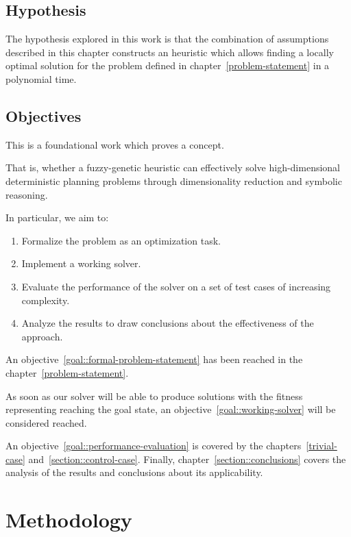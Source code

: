 \documentclass[12pt, a4paper]{report}
\begin{document}
	\section{Hypothesis}
	The hypothesis explored in this work is that the combination of assumptions described in this chapter constructs an heuristic which allows finding a locally optimal solution for the problem defined in chapter~\ref{problem-statement} in a polynomial time.
	
	\section{Objectives}\label{section::objectives}
	
	This is a foundational work which proves a concept.
	
	That is, whether a fuzzy-genetic heuristic can effectively solve high-dimensional deterministic planning problems through dimensionality reduction and symbolic reasoning.
	
	In particular, we aim to:
	\begin{enumerate}
		\item\label{goal::formal-problem-statement} Formalize the problem as an optimization task.
		\item\label{goal::working-solver} Implement a working solver.
		\item\label{goal::performance-evaluation} Evaluate the performance of the solver on a set of test cases of increasing complexity.
		\item\label{goal::conclusions} Analyze the results to draw conclusions about the effectiveness of the approach.
	\end{enumerate}

	An objective~\ref{goal::formal-problem-statement} has been reached in the chapter~\ref{problem-statement}.
	
	As soon as our solver will be able to produce solutions with the fitness representing reaching the goal state, an objective~\ref{goal::working-solver} will be considered reached.
	
	An objective~\ref{goal::performance-evaluation} is covered by the chapters~\ref{trivial-case} and~\ref{section::control-case}.
	Finally, chapter~\ref{section::conclusions} covers the analysis of the results and conclusions about its applicability.
	
	\chapter{Methodology}\label{methodology}
\end{document}
